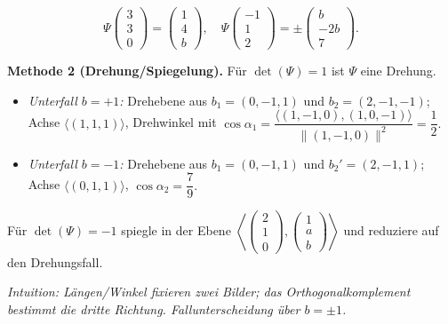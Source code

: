 \documentclass[11pt, a4paper]{article}
\begin{document}
\begin{framed}
\[\Psi\!\begin{pmatrix}3\\3\\0\end{pmatrix}=\begin{pmatrix}1\\4\\b\end{pmatrix},\quad
\Psi\!\begin{pmatrix}-1\\1\\2\end{pmatrix}=\pm\begin{pmatrix}b\\-2b\\7\end{pmatrix}.
\]

\smallskip
\textbf{Methode 2 (Drehung/Spiegelung).}
Für $\det(\Psi)=1$ ist $\Psi$ eine Drehung. 
\begin{itemize}
\item \emph{Unterfall $b=+1$:} Drehebene aus
$b_1=(0,-1,1)$ und $b_2=(2,-1,-1)$; Achse $\langle(1,1,1)\rangle$,
Drehwinkel mit
\(
\cos\alpha_1=\dfrac{\langle (1,-1,0),(1,0,-1)\rangle}{\|(1,-1,0)\|^2}=\dfrac12.
\)
\item \emph{Unterfall $b=-1$:} Drehebene aus
$b_1=(0,-1,1)$ und $b_2'=(2,-1,1)$; Achse $\langle(0,1,1)\rangle$,
\(
\cos\alpha_2=\dfrac{7}{9}.
\)
\end{itemize}
Für $\det(\Psi)=-1$ spiegle in der Ebene
$\left\langle\begin{pmatrix}2\\1\\0\end{pmatrix},\begin{pmatrix}1\\a\\b\end{pmatrix}\right\rangle$
und reduziere auf den Drehungsfall.

\medskip\noindent\textit{Intuition: Längen/Winkel fixieren zwei Bilder; das Orthogonalkomplement bestimmt die dritte Richtung. Fallunterscheidung über $b=\pm1$.}
\end{framed}
\end{document}
